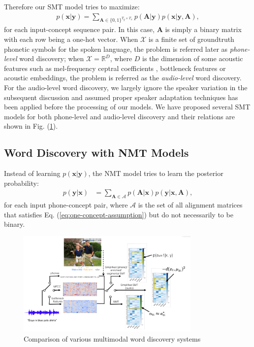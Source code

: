 \documentclass[journal]{IEEEtran}
\newcommand{\reals}{\mathbb R}
\begin{document}
Therefore our SMT model tries to maximize:
\begin{align}\label{eq:smt_trans_prob}
    p(\mathbf{x}|\mathbf{y}) = \sum_{\mathbf{A}\in \{0, 1\}^{T_y  \times T_x}} p(\mathbf{A}|\mathbf{y}) p(\mathbf{x}|\mathbf{y}, \mathbf{A}),
\end{align}
for each input-concept sequence pair. In this case, $\mathbf A$ is simply a binary matrix with each row being a one-hot vector. When $\mathcal X$ is a finite set of groundtruth phonetic symbols for the spoken language, the problem is referred later as \textit{phone-level} word discovery; when $\mathcal X = \reals^{D}$, where $D$ is the dimension of some acoustic features such as mel-frequency ceptral coefficients \cite{Davis1980}, bottleneck features \cite{Roweis1997, Fer2017} or acoustic embeddings, the problem is referred as the \textit{audio-level} word discovery. For the audio-level word discovery, we largely ignore the speaker variation in the subsequent discussion and assumed proper speaker adaptation techniques has been applied before the processing of our models.
We have proposed several SMT models for both phone-level and audio-level discovery and their relations are shown in Fig. (\ref{fig:model_comparison}).

\subsection{Word Discovery with NMT Models}
Instead of learning $p(\mathbf x|\mathbf y)$, the NMT model tries to learn the posterior probability:
\begin{align}\label{eq:nmt_trans_prob}
    p(\mathbf y|\mathbf x) &= \sum_{\mathbf A \in \mathcal A} p(\mathbf A|\mathbf x) p(\mathbf y|\mathbf x, \mathbf A),
\end{align}
for each input phone-concept pair, where $\mathcal{A}$ is the set of all alignment matrices that satisfies Eq. (\ref{eq:one-concept-assumption}) but do not necessarily to be binary. 

\begin{figure}[t]
    \centering
    \includegraphics[width=0.8\textwidth]{fig_1.png}
    \caption{Comparison of various multimodal word discovery systems}
    \label{fig:model_comparison}
\end{figure}
\end{document}
